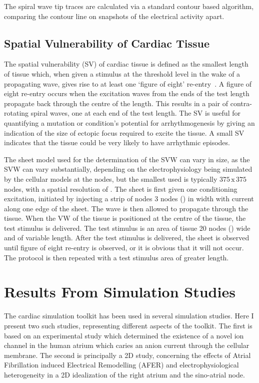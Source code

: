The spiral wave tip traces are calculated via a standard contour based
algorithm, comparing the  contour line on snapshots of the electrical
activity  apart.

\subsection{Spatial Vulnerability of Cardiac Tissue}

The spatial vulnerability (SV) of cardiac tissue is defined as the smallest
length of tissue which, when given a stimulus at the threshold level in the wake
of a propagating wave, gives rise to at least one `figure of eight'
re-entry~\cite{Zou2005}.
A figure of eight re-entry occurs when the excitation waves from the ends of the
test length propagate back through the centre of the length.
This results in a pair of contra-rotating spiral waves, one at each end of the
test length.
The SV is useful for quantifying a mutation or condition's potential for
arrhythmogenesis by giving an indication of the size of ectopic focus required
to excite the tissue.
A small SV indicates that the tissue could be very likely to have arrhythmic
episodes.

The sheet model used for the determination of the SVW can vary in size, as the
SVW can vary substantially, depending on the electrophysiology being simulated
by the cellular models at the nodes, but the smallest used is typically
$375\,\text{x}\,375$ nodes, with a spatial resolution of .  The sheet is first given one
conditioning excitation, initiated by injecting a strip of nodes 3 nodes
() in width with current along one edge of the sheet.  The wave is then
allowed to propagate through the tissue.  When the VW of the tissue is
positioned at the centre of the tissue, the test stimulus is delivered.  The
test stimulus is an area of tissue 20 nodes () wide and of variable length.
After the test stimulus is delivered, the sheet is observed until figure of
eight re-entry is observed, or it is obvious that it will not occur.  The
protocol is then repeated with a test stimulus area of greater length.


\section{Results From Simulation Studies}

The cardiac simulation toolkit has been used in several simulation studies.
Here I present two such studies, representing different aspects of the toolkit.
The first is based on an experimental study which determined the existence of a
novel ion channel in the human atrium which caries an anion current through the
cellular membrane.  The second is principally a 2D study, concerning the effects
of Atrial Fibrillation induced Electrical Remodelling (AFER) and
electrophysiological heterogeneity in a 2D idealization of the right atrium and
the sino-atrial node.

